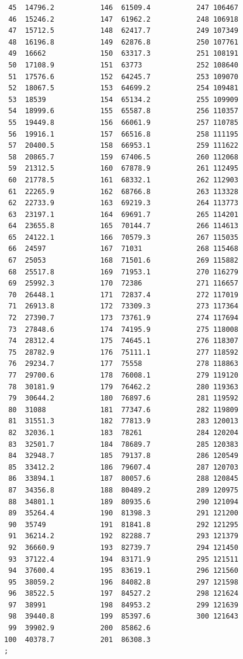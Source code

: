 \documentclass{article}
\begin{document}
\begin{verbatim}
 45  14796.2           146  61509.4           247 106467
 46  15246.2           147  61962.2           248 106918
 47  15712.5           148  62417.7           249 107349
 48  16196.8           149  62876.8           250 107761
 49  16662             150  63317.3           251 108191
 50  17108.9           151  63773             252 108640
 51  17576.6           152  64245.7           253 109070
 52  18067.5           153  64699.2           254 109481
 53  18539             154  65134.2           255 109909
 54  18999.6           155  65587.8           256 110357
 55  19449.8           156  66061.9           257 110785
 56  19916.1           157  66516.8           258 111195
 57  20400.5           158  66953.1           259 111622
 58  20865.7           159  67406.5           260 112068
 59  21312.5           160  67878.9           261 112495
 60  21778.5           161  68332.1           262 112903
 61  22265.9           162  68766.8           263 113328
 62  22733.9           163  69219.3           264 113773
 63  23197.1           164  69691.7           265 114201
 64  23655.8           165  70144.7           266 114613
 65  24122.1           166  70579.3           267 115035
 66  24597             167  71031             268 115468
 67  25053             168  71501.6           269 115882
 68  25517.8           169  71953.1           270 116279
 69  25992.3           170  72386             271 116657
 70  26448.1           171  72837.4           272 117019
 71  26913.8           172  73309.3           273 117364
 72  27390.7           173  73761.9           274 117694
 73  27848.6           174  74195.9           275 118008
 74  28312.4           175  74645.1           276 118307
 75  28782.9           176  75111.1           277 118592
 76  29234.7           177  75558             278 118863
 77  29700.6           178  76008.1           279 119120
 78  30181.9           179  76462.2           280 119363
 79  30644.2           180  76897.6           281 119592
 80  31088             181  77347.6           282 119809
 81  31551.3           182  77813.9           283 120013
 82  32036.1           183  78261             284 120204
 83  32501.7           184  78689.7           285 120383
 84  32948.7           185  79137.8           286 120549
 85  33412.2           186  79607.4           287 120703
 86  33894.1           187  80057.6           288 120845
 87  34356.8           188  80489.2           289 120975
 88  34801.1           189  80935.6           290 121094
 89  35264.4           190  81398.3           291 121200
 90  35749             191  81841.8           292 121295
 91  36214.2           192  82288.7           293 121379
 92  36660.9           193  82739.7           294 121450
 93  37122.4           194  83171.9           295 121511
 94  37600.4           195  83619.1           296 121560
 95  38059.2           196  84082.8           297 121598
 96  38522.5           197  84527.2           298 121624
 97  38991             198  84953.2           299 121639
 98  39440.8           199  85397.6           300 121643
 99  39902.9           200  85862.6
100  40378.7           201  86308.3
;


\end{verbatim}
\end{document}
